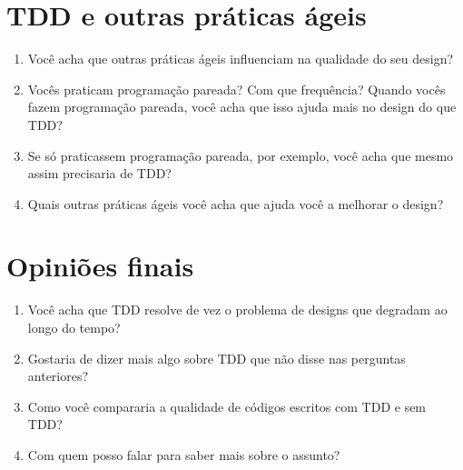 \section{TDD e outras práticas ágeis}
\label{entrevista:tdd-e-praticas-ageis}

\begin{enumerate}
	\item Você acha que outras práticas ágeis influenciam na qualidade do seu design?

	\item Vocês praticam programação pareada? Com que frequência? Quando vocês
	fazem programação pareada, você acha que isso ajuda mais no design do que TDD?

	\item Se só praticassem programação pareada, por exemplo, você acha que mesmo
	assim precisaria de TDD?

	\item Quais outras práticas ágeis você acha que ajuda você a melhorar o design?
\end{enumerate}

\section{Opiniões finais}

\begin{enumerate}
	\item Você acha que TDD resolve de vez o problema de designs que degradam ao longo do tempo?

	\item Gostaria de dizer mais algo sobre TDD que não disse nas perguntas anteriores?
	
	\item Como você compararia a qualidade de códigos escritos com TDD e sem TDD? 

	\item Com quem posso falar para saber mais sobre o assunto?
\end{enumerate}

